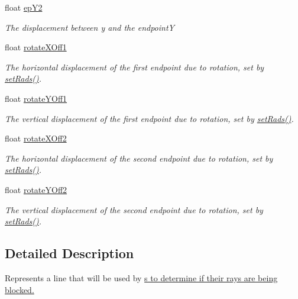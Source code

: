 \begin{DoxyCompactItemize}
float \hyperlink{classlighting_1_1LightBlocker_ac208ae1dafe53ec7ceab6d60113c6ca1}{ep\+Y2}
\begin{DoxyCompactList}\small\item\em The displacement between y and the endpointY \end{DoxyCompactList}\item 
float \hyperlink{classlighting_1_1LightBlocker_a51b85e054f0ffaf8ae51d305b62e6a6f}{rotate\+X\+Off1}
\begin{DoxyCompactList}\small\item\em The horizontal displacement of the first endpoint due to rotation, set by \hyperlink{classlighting_1_1LightBlocker_a1fe1c13013aeee813526ae74cd5a984c}{set\+Rads()}. \end{DoxyCompactList}\item 
float \hyperlink{classlighting_1_1LightBlocker_a3c9c30ae0058e5f97b13c785f9ab879a}{rotate\+Y\+Off1}
\begin{DoxyCompactList}\small\item\em The vertical displacement of the first endpoint due to rotation, set by \hyperlink{classlighting_1_1LightBlocker_a1fe1c13013aeee813526ae74cd5a984c}{set\+Rads()}. \end{DoxyCompactList}\item 
float \hyperlink{classlighting_1_1LightBlocker_a5e08ff3bf8f8f26b8660f95114184b5c}{rotate\+X\+Off2}
\begin{DoxyCompactList}\small\item\em The horizontal displacement of the second endpoint due to rotation, set by \hyperlink{classlighting_1_1LightBlocker_a1fe1c13013aeee813526ae74cd5a984c}{set\+Rads()}. \end{DoxyCompactList}\item 
float \hyperlink{classlighting_1_1LightBlocker_aea5301a408a819c955c9227ff6a41009}{rotate\+Y\+Off2}
\begin{DoxyCompactList}\small\item\em The vertical displacement of the second endpoint due to rotation, set by \hyperlink{classlighting_1_1LightBlocker_a1fe1c13013aeee813526ae74cd5a984c}{set\+Rads()}. \end{DoxyCompactList}\end{DoxyCompactItemize}


\subsection{Detailed Description}
Represents a line that will be used by \hyperlink{classlighting_1_1LightSource}{s to determine if their rays are being blocked. } 



